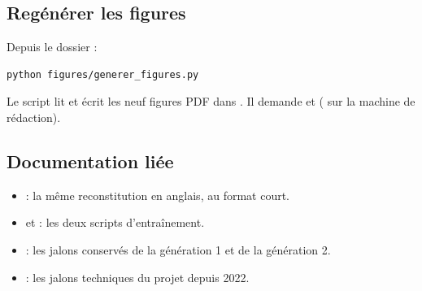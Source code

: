 \subsection{Regénérer les figures}

Depuis le dossier  :

\begin{verbatim}
python figures/generer_figures.py
\end{verbatim}

Le script lit  et écrit les neuf figures PDF dans
. Il demande  et 
( sur la machine de rédaction).

\subsection{Documentation liée}

\begin{itemize}[leftmargin=1.2em,itemsep=2pt,topsep=2pt]
  \item {} : la même reconstitution en
        anglais, au format court.
  \item {} et
         : les deux scripts
        d'entraînement.
  \item {} : les jalons conservés de la
        génération 1 et de la génération 2.
  \item {} : les jalons techniques du projet depuis 2022.
\end{itemize}
